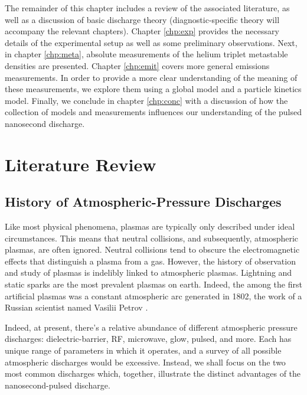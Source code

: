 The remainder of this chapter includes a review of the associated literature, as
well as a discussion of basic discharge theory (diagnostic-specific theory will
accompany the relevant chapters). Chapter \ref{chp:exp} provides the necessary
details of the experimental setup as well as some preliminary observations.
Next, in chapter \ref{chp:meta}, absolute measurements of the helium triplet
metastable densities are presented. Chapter \ref{chp:emit} covers more general
emissions measurements. In order to provide a more clear understanding of the
meaning of these measurements, we explore them using a global model and a
particle kinetics model. Finally, we conclude in chapter \ref{chp:conc} with a
discussion of how the collection of models and measurements influences our
understanding of the pulsed nanosecond discharge.

\section{Literature Review}

\subsection{History of Atmospheric-Pressure Discharges}

Like most physical phenomena, plasmas are typically only described under ideal
circumstances. This means that neutral collisions, and subsequently, atmospheric
plasmas, are often ignored. Neutral collisions tend to obscure the
electromagnetic effects that distinguish a plasma from a gas. However, the
history of observation and study of plasmas is indelibly linked to atmospheric
plasmas. Lightning and static sparks are the most prevalent plasmas on earth. 
Indeed, the among the first artificial plasmas was a constant atmospheric arc
generated in 1802, the work of a Russian scientist named Vasilii Petrov
\cite{Anders2003}.

Indeed, at present, there's a relative abundance of different atmospheric
pressure discharges: dielectric-barrier, RF, microwave, glow, pulsed, and more.
Each has unique range of parameters in which it operates, and a survey of all
possible atmospheric discharges would be excessive. Instead, we shall focus on
the two most common discharges which, together, illustrate the distinct
advantages of the nanosecond-pulsed discharge.

